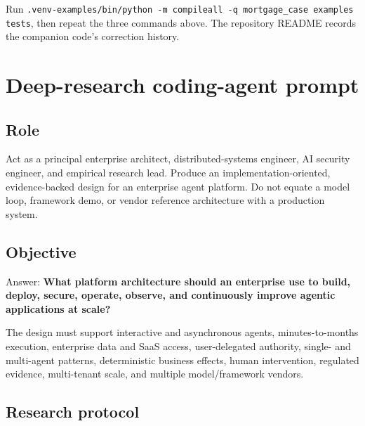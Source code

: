 Run \lstinline[style=bookinline]!.venv-examples/bin/python -m compileall -q mortgage_case examples tests!, then repeat the three commands above. The repository README records the companion code's correction history.\par


\section{Deep-research coding-agent prompt}

\subsection{Role}

Act as a principal enterprise architect, distributed-systems engineer, AI security engineer, and empirical research lead. Produce an implementation-oriented, evidence-backed design for an enterprise agent platform. Do not equate a model loop, framework demo, or vendor reference architecture with a production system.\par

\subsection{Objective}

Answer: \textbf{What platform architecture should an enterprise use to build, deploy, secure, operate, observe, and continuously improve agentic applications at scale?}\par

The design must support interactive and asynchronous agents, minutes-to-months execution, enterprise data and SaaS access, user-delegated authority, single- and multi-agent patterns, deterministic business effects, human intervention, regulated evidence, multi-tenant scale, and multiple model/framework vendors.\par

\subsection{Research protocol}


